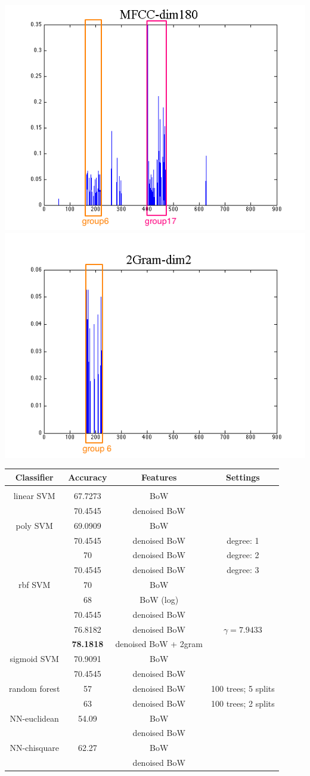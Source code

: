 
\includegraphics[width=0.18 \linewidth]{./images/mfcc_180.png}
\includegraphics[width=0.19 \linewidth]{./images/ngram_202.png}

\footnotesize
\begin{tabular}{cccc}
\multicolumn{1}{c}{\bf Classifier }&\multicolumn{1}{c}{\bf Accuracy}  &\multicolumn{1}{c}{\bf Features} &\multicolumn{1}{c}{\bf Settings}
\\ \hline \\
linear SVM		&67.7273 		&BoW 		&  \\
			& 70.4545  	& denoised BoW 	&  \\
poly SVM		&69.0909		&BoW 		&  \\
			& 70.4545  	& denoised BoW 	& degree: 1  \\
			& 70 			& denoised BoW 	& degree: 2  \\
			& 70.4545  	& denoised BoW 	& degree: 3  \\
rbf SVM       	&70 			&BoW 		&  \\
                     	&68  			&  BoW (log) 	&  \\
          		&70.4545  		&  denoised BoW 	&  \\
          		&76.8182  		&  denoised BoW 	&  $\gamma = 7.9433$ \\
          		&{\bf 78.1818}  	&  denoised BoW + 2gram 	&    \\
sigmoid SVM     	&70.9091		&BoW 		&  \\
       			&70.4545  		& denoised BoW 	&  \\
random forest    	&57			& denoised BoW	& 100 trees; 5 splits \\
       			&63  			& denoised BoW 	& 100 trees; 2 splits \\
NN-euclidean   	&54.09		& BoW	&  \\
       			&			& denoised BoW 	&  \\
NN-chisquare	&62.27		& BoW	&  \\
       			&			& denoised BoW 	& \\

\end{tabular}


